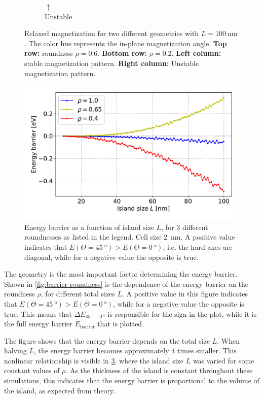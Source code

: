 \documentclass[11pt,a4paper,english,twoside]{article}
\begin{document}
\begin{figure}
\begin{subfigure}[b]{0.2\textwidth}
         \caption*{$\uparrow$\\Unstable}
         \label{fig:barrier-magnetization-20x100_ortho}
     \end{subfigure}
    \caption{Relaxed magnetization for two different geometries with $L=\SI{100}{\nano\metre}$. The color hue represents the in-plane magnetization angle. \textbf{Top row:} roundness $\rho=0.6$. \textbf{Bottom row:} $\rho=0.2$. \textbf{Left column:} stable magnetization pattern. \textbf{Right column:} Unstable magnetization pattern.}
    \label{fig:barrier-magnetization}
\end{figure}
\begin{figure}
    \centering
    \includegraphics[width=0.9\columnwidth]{Figures/biaxial_island/Barrier/Plus_L100-10_rho1.0,0.65,0.4_cell1nm.pdf}
    \caption{Energy barrier as a function of island size $L$, for 3 different roundnesses as listed in the legend. Cell size \SI{2}{\nano\metre}. A positive value indicates that $E(\Theta=\SI{45}{\degree}) > E(\Theta=\SI{0}{\degree})$, i.e. the hard axes are diagonal, while for a negative value the opposite is true.}
    \label{fig:barrier-size}
\end{figure}
The geometry is the most important factor determining the energy barrier. Shown in \cref{fig:barrier-roundness} is the dependence of the energy barrier on the roundness $\rho$, for different total sizes $L$. A positive value in this figure indicates that $E(\Theta=\SI{45}{\degree}) > E(\Theta=\SI{0}{\degree})$, while for a negative value the opposite is true. This means that $\Delta E_{\SI{45}{\degree}-\SI{0}{\degree}}$ is responsible for the sign in the plot, while it is the full energy barrier $E_\mathrm{barrier}$ that is plotted. \par
The figure shows that the energy barrier depends on the total size $L$. When halving $L$, the energy barrier becomes approximately 4 times smaller. This nonlinear relationship is visible in \cref{fig:barrier-size}, where the island size $L$ was varied for some constant values of $\rho$. As the thickness of the island is constant throughout these simulations, this indicates that the energy barrier is proportional to the volume of the island, as expected from theory. \par
\end{document}
